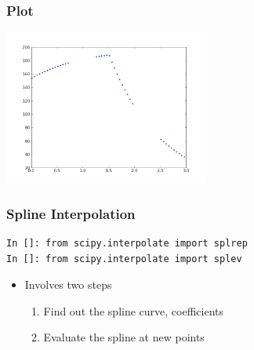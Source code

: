 \documentclass[14pt,compress]{beamer}
\newcommand{\typ}[1]{\lstinline{#1}}
\begin{document}
\begin{frame}
  \frametitle{Plot}
  \begin{center}
    \includegraphics[height=2in, interpolate=true]{data/missing_points}
  \end{center}
\end{frame}


\begin{frame}[fragile]
\frametitle{Spline Interpolation}
\begin{small}
\begin{lstlisting}
In []: from scipy.interpolate import splrep
In []: from scipy.interpolate import splev
\end{lstlisting}
\end{small}
\begin{itemize}
\item Involves two steps
  \begin{enumerate}
  \item Find out the spline curve, coefficients
  \item Evaluate the spline at new points
  \end{enumerate}
\end{itemize}
\end{frame}
\end{document}
